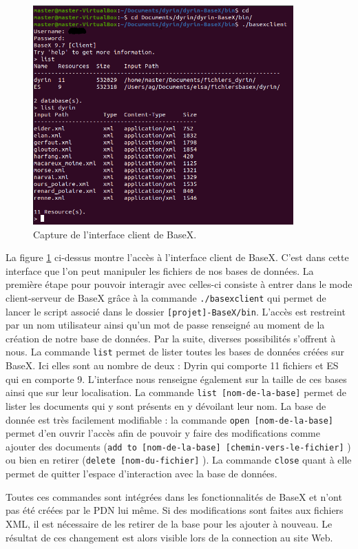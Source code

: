 \documentclass[a4paper,12pt,twoside]{book}
\begin{document}
    \begin{figure}[H]
    \centering
    \includegraphics[width=10cm]{img/partie_1/basex_client.png}
    \caption{Capture de l'interface client de BaseX.}
    \label{bx}
\end{figure}
    
    La figure \ref{bx} ci-dessus montre l'accès à l'interface client de BaseX. C'est dans cette interface que l'on peut manipuler les fichiers de nos bases de données.
    La première étape pour pouvoir interagir avec celles-ci consiste à entrer dans le mode client-serveur de BaseX grâce à la commande \texttt{./basexclient} qui permet de lancer le script associé dans le dossier \texttt{[projet]-BaseX/bin}. L'accès est restreint par un nom utilisateur ainsi qu'un mot de passe renseigné au moment de la création de notre base de données. Par la suite, diverses possibilités s'offrent à nous. La commande \texttt{list} permet de lister toutes les bases de données créées sur BaseX. Ici elles sont au nombre de deux : Dyrin qui comporte 11 fichiers et ES qui en comporte 9. L'interface nous renseigne également sur la taille de ces bases ainsi que sur leur localisation. La commande \texttt{list [nom-de-la-base]} permet de lister les documents qui y sont présents en y dévoilant leur nom. La base de donnée est très facilement modifiable : la commande \texttt{open [nom-de-la-base]} permet d'en ouvrir l'accès afin de pouvoir y faire des modifications comme ajouter des documents (\texttt{add to [nom-de-la-base] [chemin-vers-le-fichier]} ) ou bien en retirer (\texttt{delete [nom-du-fichier]} ). La commande \texttt{close} quant à elle permet de quitter l'espace d'interaction avec la base de données.
    
    Toutes ces commandes sont intégrées dans les fonctionnalités de BaseX et n'ont pas été créées par le \acrshort{PDN} lui même. Si des modifications sont faites aux fichiers XML, il est nécessaire de les retirer de la base pour les ajouter à nouveau. Le résultat de ces changement est alors visible lors de la connection au site Web.
    
\end{document}
